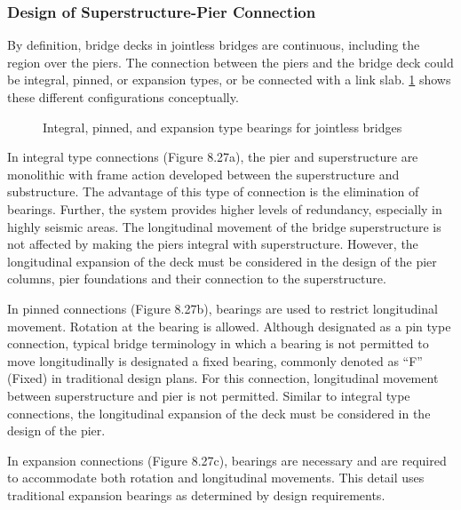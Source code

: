 \subsubsection{Design of Superstructure-Pier Connection}
By definition, bridge decks in jointless bridges are continuous, including the region over the piers. The connection between the piers and the bridge deck could be integral, pinned, or expansion types, or be connected with a link slab. \cref{fig:bearing-jointless-bridges} shows these different configurations conceptually.

\begin{figure}
  \caption{Integral, pinned, and expansion type bearings for jointless bridges}
  \label{fig:bearing-jointless-bridges}
\end{figure}

In integral type connections (Figure 8.27a), the pier and superstructure are monolithic with frame action developed between the superstructure and substructure. The advantage of this type of connection is the elimination of bearings. Further, the system provides higher levels of redundancy, especially in highly seismic areas. The longitudinal movement of the bridge superstructure is not affected by making the piers integral with superstructure. However, the longitudinal expansion of the deck must be considered in the design of the pier columns, pier foundations and their connection to the superstructure.

In pinned connections (Figure 8.27b), bearings are used to restrict longitudinal movement. Rotation at the bearing
is allowed. Although designated as a pin type connection, typical bridge terminology in which a bearing is not
permitted to move longitudinally is designated a fixed bearing, commonly denoted as “F” (Fixed) in traditional design
plans. For this connection, longitudinal movement between superstructure and pier is not permitted. Similar to
integral type connections, the longitudinal expansion of the deck must be considered in the design of the pier.

In expansion connections (Figure 8.27c), bearings are necessary and are required to accommodate both rotation
and longitudinal movements. This detail uses traditional expansion bearings as determined by design requirements.

